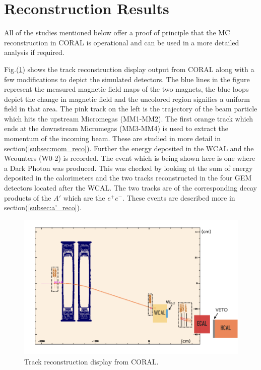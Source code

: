 \section{Reconstruction Results}
All of the studies mentioned below offer a proof of principle that the MC reconstruction in CORAL is operational and can be used in a more detailed analysis if required.

Fig.(\ref{fig:CORAL_display}) shows the track reconstruction display output from CORAL along with a few modifications to depict the simulated detectors. The blue lines in the figure represent the measured magnetic field maps of the two magnets, the blue loops depict the change in magnetic field and the uncolored region signifies a uniform field in that area. The pink track on the left is the trajectory of the beam particle which hits the upstream Micromegas (MM1-MM2). The first orange track which ends at the downstream Micromegas (MM3-MM4) is used to extract the momentum of the incoming beam. These are studied in more detail in section(\ref{subsec:mom_reco}). Further the energy deposited in the WCAL and the Wcounters (W0-2) is recorded. The event which is being shown here is one where a Dark Photon was produced. This was checked by looking at the sum of energy deposited in the calorimeters and the two tracks reconstructed in the four GEM detectors located after the WCAL. The two tracks are of the corresponding decay products of the $A'$ which are the $e^+ e^-$. These events are described more in section(\ref{subsec:a'_reco}).
 \begin{figure}[t!]
 \centering
 \includegraphics[width=\textwidth]{thesis_figures/MC_reco/CORAL_display_2.png}
 \caption{Track reconstruction display from CORAL.}
 \label{fig:CORAL_display}
 \end{figure}

